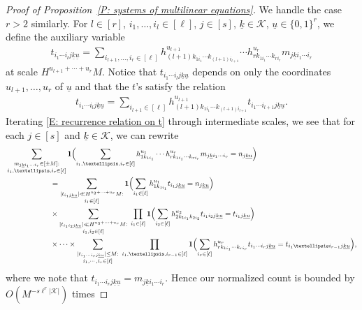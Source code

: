 \documentclass[11pt]{amsart}
\theoremstyle{definition}
\newcommand{\CK}{{\mathcal K}}
\newcommand{\uk}{{\underline{k}}}
\newcommand{\uu}{{\underline{u}}}
\newcommand{\Bigbrac}[1]{\Bigl( #1 \Bigr)}
\begin{document}
\begin{proof}[Proof of Proposition~\ref{P: systems of multilinear equations}]
We handle the case $r>2$ similarly. For $l\in[r]$, $i_1, \ldots, i_l\in[\ell]$, $j\in[s]$, $\uk\in\CK$, $\uu\in\{0,1\}^r$, we define the auxiliary variable
\begin{align*}
    t_{i_1\cdots i_l j \uk\uu} =\sum\limits_{i_{l+1}, \ldots, i_r\in[\ell]}h_{(l+1)k_{1i_1} \cdots k_{(l+1)i_{l+1}}}^{u_{l+1}}\cdots h_{r k_{1i_1}\cdots k_{ri_r}}^{u_r}m_{j\uk i_1\cdots i_r}
\end{align*}
at scale $H^{u_{l+1}+\cdots+u_r}M$.
Notice that $t_{i_1\cdots i_l j \uk\uu}$ depends on only the coordinates $u_{l+1}, \ldots, u_r$ of $\uu$ and that the $t$'s satisfy the relation
\begin{align}\label{E: recurrence relation on t}
    t_{i_1\cdots i_l j \uk\uu} = \sum_{i_{l+1}\in[\ell]}h_{(l+1)k_{1i_1} \cdots k_{(l+1)i_{l+1}}}^{u_{l+1}} t_{i_1\cdots i_{l+1} j \uk\uu}.
\end{align}
Iterating \eqref{E: recurrence relation on t} through intermediate scales, we see that {for each $j \in [s]$ and $\uk \in \CK$,} we can rewrite
\begin{align*}
        &\sum_{\substack{m_{j\uk i_1\cdots i_r}\in[\pm M]:\\ 
        i_1, \ldots,  i_r\in[\ell]}} \mathbf{1}\Bigbrac{\sum\limits_{i_1, \ldots, i_r\in[\ell]} h_{1k_{1i_1}}^{u_1} \cdots h_{rk_{1i_1}\cdots k_{ri_r}}^{u_r}m_{j\uk i_1\cdots i_r} = n_{j\uk\uu}} \\
        &\qquad\qquad\qquad=\sum_{\substack{|t_{i_1 j\uk\uu}|\ll H^{u_2+\cdots + u_r}M:\\ i_1\in[\ell]}} \mathbf{1}\Bigbrac{\sum\limits_{i_1\in[\ell]} h_{1k_{1i_1}}^{u_1} t_{i_1 j\uk\uu}= n_{j\uk\uu}}\\ 
    &\qquad\qquad\qquad\times \sum_{\substack{|t_{i_1i_2 j\uk\uu}|\ll H^{u_3+\cdots +u_r}M:\\ i_1, i_2\in[\ell]}}\;\prod_{i_1\in[\ell]} \mathbf{1}\Bigbrac{\sum\limits_{i_2\in[\ell]} h_{2k_{1i_1}k_{2i_2}}^{u_2}t_{i_1 i_2 j\uk\uu} = t_{i_1 j\uk\uu}}\\
    &\qquad\qquad\qquad\times \cdots \times  \sum_{\substack{|t_{i_1\cdots i_r j\uk\uu}|\leq M:\\ i_1, \cdots, i_r\in[\ell]}}\;\prod_{i_1,\ldots, i_{r-1}\in[\ell]} \mathbf{1}\Bigbrac{\sum\limits_{i_r\in[\ell]} h_{rk_{1i_1}\cdots k_{r i_r}}^{u_r}t_{i_1 \cdots i_r j\uk\uu} = t_{i_1 \ldots i_{r-1} j\uk\uu}},
\end{align*}
where we note that $t_{i_1 \cdots i_r j\uk\uu} = m_{j\uk i_1\cdots i_r}$. Hence our normalized count is bounded by $O(M^{-s\ell^r|\CK|})$ times

\end{proof}
\end{document}
